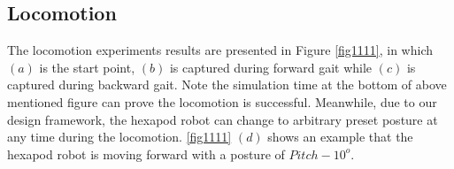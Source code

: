 \documentclass[conference]{IEEEtran}
\begin{document}
\subsection{Locomotion}
The locomotion experiments results are presented in Figure \ref{fig1111}, in which \((a)\) is the start point, \((b)\) is captured during forward gait while \((c)\) is captured during backward gait. Note the simulation time at the bottom of above mentioned figure can prove the locomotion is successful. Meanwhile, due to our design framework, the hexapod robot can change to arbitrary preset posture at any time during the locomotion. \ref{fig1111} \((d)\) shows an example that the hexapod robot is moving forward with a posture of \(Pitch - 10^o\).
\begin{figure}
    \centering
    \centering
    \\

\end{figure}
\end{document}
